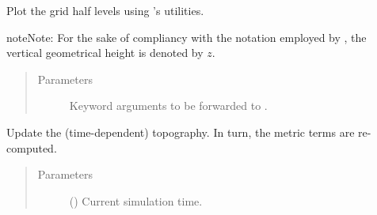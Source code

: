 \documentclass[letterpaper,10pt,english]{sphinxmanual}
\begin{document}
\begin{fulllineitems}

\begin{fulllineitems}
\label{\detokenize{api:grids.sleve.SLEVE2d.plot}}
Plot the grid half levels using ’s utilities.

\begin{sphinxadmonition}{note}{Note:}
For the sake of compliancy with the notation employed by ,
the vertical geometrical height is denoted by \(z\).
\end{sphinxadmonition}
\begin{quote}\begin{description}
\item[{Parameters}] \leavevmode
{} \textendash{} Keyword arguments to be forwarded to .

\end{description}\end{quote}

\end{fulllineitems}


\begin{fulllineitems}
\label{\detokenize{api:grids.sleve.SLEVE2d.update_topography}}
Update the (time-dependent) topography. In turn, the metric terms are re-computed.
\begin{quote}\begin{description}
\item[{Parameters}] \leavevmode
{} () \textendash{} Current simulation time.

\end{description}\end{quote}

\end{fulllineitems}


\end{fulllineitems}
\end{document}
